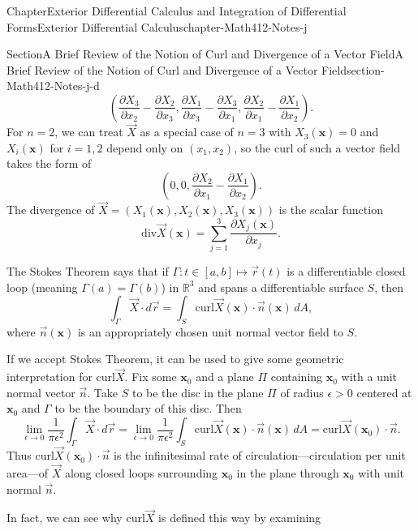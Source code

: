\documentclass[oneside,10pt,]{book}
\numberwithin{equation}{section}
\newcommand{\bx}{\mathbf{x}}
\newcommand{\bbR}{\mathbb{R}}
\begin{document}
\begin{chapterptx}{Chapter}{Exterior Differential Calculus and Integration of Differential Forms}{}{Exterior Differential Calculus}{}{}{chapter-Math412-Notes-j}
\begin{sectionptx}{Section}{A Brief Review of the Notion of Curl and Divergence of a Vector Field}{}{A Brief Review of the Notion of Curl and Divergence of a Vector Field}{}{}{section-Math412-Notes-j-d}
\begin{equation*}
(\frac{\partial X_3}{\partial x_2}-\frac{\partial X_2}{\partial x_3},
\frac{\partial X_1}{\partial x_3}-\frac{\partial X_3}{\partial x_1},
\frac{\partial X_2}{\partial x_1}-\frac{\partial X_1}{\partial x_2}).
\end{equation*}
For \(n=2\), we can treat \(\vec{X}\) as a special case of \(n=3\) with \(X_{3}(\bx)=0\) and \(X_{i}(\bx)\) for \(i=1, 2\) depend only on \((x_{1}, x_{2})\), so the curl of such a vector field takes the form of%
\begin{equation*}
(0, 0, \frac{\partial X_2}{\partial x_1}-\frac{\partial X_1}{\partial x_2}).
\end{equation*}
The divergence of \(\vec{X}=(X_{1}(\bx), X_{2}(\bx), X_{3}(\bx))\) is the scalar function%
\begin{equation*}
\text{div}\vec{X}(\bx)= \sum_{j=1}^{3} \frac{\partial X_j(\bx)}{\partial x_j}.
\end{equation*}
%
\par
The Stokes Theorem says that if \(\Gamma: t\in [a, b]\mapsto \vec{r}(t)\) is a differentiable closed loop (meaning \(\Gamma(a)=\Gamma(b)\)) in \(\bbR^{3}\) and spans a differentiable surface \(S\), then%
\begin{equation*}
\int_{\Gamma} \vec{X}\cdot d\vec{r} = \int_S \text{curl}\vec{X}(\bx) \cdot \vec{n}(\bx)\, dA,
\end{equation*}
where \(\vec{n}(\bx)\) is an appropriately chosen unit normal vector field to \(S\).%
\par
If we accept Stokes Theorem, it can be used to give some geometric interpretation for \(\text{curl}\vec{X}\).  Fix some \(\bx_{0}\) and a plane \(\Pi\) containing \(\bx_{0}\) with a unit normal vector \(\vec{n}\). Take \(S\) to be the disc in the plane \(\Pi\) of radius \(\epsilon >0\) centered at \(\bx_{0}\) and \(\Gamma\) to be the boundary of this disc. Then%
\begin{equation*}
\lim_{\epsilon \to 0} \frac{1}{\pi \epsilon^{2}} \int_{\Gamma} \vec{X}\cdot d\vec{r}=
\lim_{\epsilon \to 0} \frac{1}{\pi \epsilon^{2}} \int_S \text{curl}\vec{X}(\bx) \cdot \vec{n}(\bx)\, dA
=\text{curl}\vec{X}(\bx_{0}) \cdot \vec{n}.
\end{equation*}
Thus \(\text{curl}\vec{X}(\bx_{0}) \cdot \vec{n}\) is the infinitesimal rate of circulation\(\mbox{---}\)circulation per unit area\(\mbox{---}\)of \(\vec{X}\) along closed loops surrounding \(\bx_{0}\) in the plane through \(\bx_{0}\) with unit normal \(\vec{n}\).%
\par
In fact, we can see why \(\text{curl}\vec{X}\) is defined this way by examining%

\end{sectionptx}
\end{chapterptx}
\end{document}
